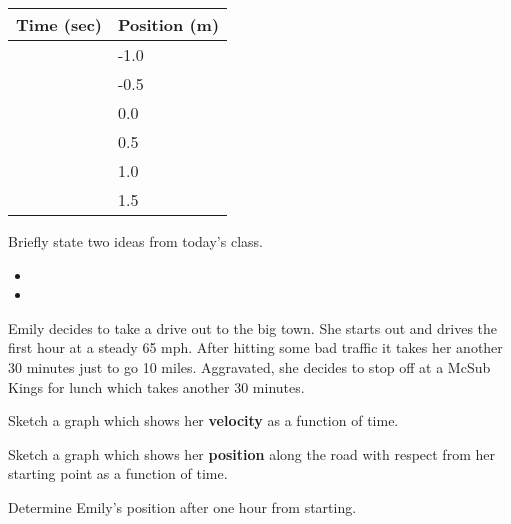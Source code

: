 \begin{problem}
\begin{subproblem}
      \begin{tabular}{l|l}
        Time (sec) & Position (m) \\ \hline
         & -1.0 \\ [12pt]
         & -0.5 \\  [12pt]
         &  0.0 \\  [12pt]
         &  0.5 \\  [12pt]
         &  1.0 \\  [12pt]
         &  1.5
      \end{tabular}

\end{subproblem}

\end{problem}


\postClass

\begin{problem}
\item Briefly state two ideas from today's class.
  \begin{itemize}
  \item
  \item
  \end{itemize}
\item Emily decides to take a drive out to the big town. She starts
  out and drives the first hour at a steady 65 mph. After hitting some
  bad traffic it takes her another 30 minutes just to go 10
  miles. Aggravated, she decides to stop off at a McSub Kings for
  lunch which takes another 30 minutes.


  \begin{subproblem}
  \item Sketch a graph which shows her \textbf{velocity} as a function
    of time.


      \vfill

    \item Sketch a graph which shows her \textbf{position} along the
      road with respect from her starting point as a function of time.


    \vfill

    \item Determine Emily's position after one hour from starting.
      \vspace{3em}


\end{subproblem}
\end{problem}
